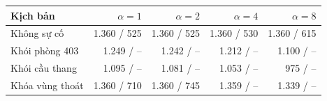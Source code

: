 \small\begin{tabular}{lrrrr}
\toprule
Kịch bản & $\alpha=1$ & $\alpha=2$ & $\alpha=4$ & $\alpha=8$\\\midrule
Không sự cố & 1.360 / 525 & 1.360 / 525 & 1.360 / 530 & 1.360 / 615\\
Khói phòng 403 & 1.249 / -- & 1.242 / -- & 1.212 / -- & 1.100 / --\\
Khói cầu thang & 1.095 / -- & 1.081 / -- & 1.053 / -- & 975 / --\\
Khóa vùng thoát & 1.360 / 710 & 1.360 / 745 & 1.359 / -- & 1.339 / --\\
\bottomrule\end{tabular}
